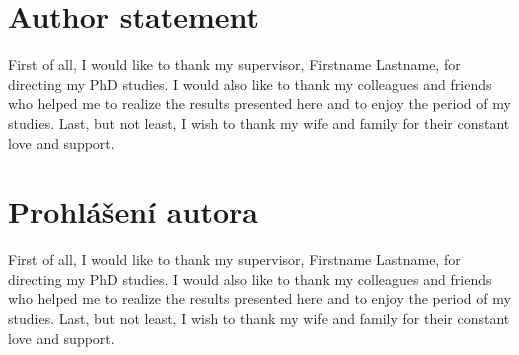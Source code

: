 \vspace*{\fill}
\section*{Author statement}
First of all, I would like to thank my supervisor, Firstname Lastname, for directing my PhD studies. I would also like to thank my colleagues and friends who helped me to realize the results presented here and to enjoy the period of my studies. 
Last, but not least, I wish to thank my wife and family for their constant love and support. 

\section*{Prohlášení autora}
First of all, I would like to thank my supervisor, Firstname Lastname, for directing my PhD studies. I would also like to thank my colleagues and friends who helped me to realize the results presented here and to enjoy the period of my studies. 
Last, but not least, I wish to thank my wife and family for their constant love and support. 

